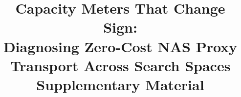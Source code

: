 \documentclass[10pt,twocolumn,letterpaper]{article}
\begin{document}
\title{Capacity Meters That Change Sign:\\
Diagnosing Zero-Cost NAS Proxy Transport Across Search Spaces\\
\large Supplementary Material}
\author{}
\maketitle



{\small


}
\end{document}
